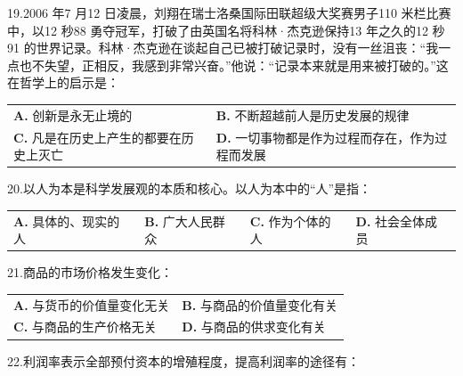 \documentclass[UTF8,11pt]{ctexart}
\begin{document}
19.2006 年7 月12 日凌晨，刘翔在瑞士洛桑国际田联超级大奖赛男子110 米栏比赛中，以12 秒88 勇夺冠军，打破了由英国名将科林·杰克逊保持13 年之久的12 秒91 的世界记录。科林·杰克逊在谈起自己已被打破记录时，没有一丝沮丧：“我一点也不失望，正相反，我感到非常兴奋。”他说：“记录本来就是用来被打破的。”这在哲学上的启示是：


\begin{center}\begin{tabular}{>{\raggedright\arraybackslash}p{\dimexpr(\linewidth-4\tabcolsep)/2\relax}>{\raggedright\arraybackslash}p{\dimexpr(\linewidth-4\tabcolsep)/2\relax}}
\textbf{A.} 创新是永无止境的 & \textbf{B.} 不断超越前人是历史发展的规律\\[.35em]
\textbf{C.} 凡是在历史上产生的都要在历史上灭亡 & \textbf{D.} 一切事物都是作为过程而存在，作为过程而发展\\[.35em]\end{tabular}\end{center}

20.以人为本是科学发展观的本质和核心。以人为本中的“人”是指：


\begin{center}\begin{tabular}{>{\raggedright\arraybackslash}p{\dimexpr(\linewidth-8\tabcolsep)/4\relax}>{\raggedright\arraybackslash}p{\dimexpr(\linewidth-8\tabcolsep)/4\relax}>{\raggedright\arraybackslash}p{\dimexpr(\linewidth-8\tabcolsep)/4\relax}>{\raggedright\arraybackslash}p{\dimexpr(\linewidth-8\tabcolsep)/4\relax}}
\textbf{A.} 具体的、现实的人 & \textbf{B.} 广大人民群众 & \textbf{C.} 作为个体的人 & \textbf{D.} 社会全体成员\\[.35em]\end{tabular}\end{center}

21.商品的市场价格发生变化：


\begin{center}\begin{tabular}{>{\raggedright\arraybackslash}p{\dimexpr(\linewidth-4\tabcolsep)/2\relax}>{\raggedright\arraybackslash}p{\dimexpr(\linewidth-4\tabcolsep)/2\relax}}
\textbf{A.} 与货币的价值量变化无关 & \textbf{B.} 与商品的价值量变化有关\\[.35em]
\textbf{C.} 与商品的生产价格无关 & \textbf{D.} 与商品的供求变化有关\\[.35em]\end{tabular}\end{center}

22.利润率表示全部预付资本的增殖程度，提高利润率的途径有：
\end{document}
